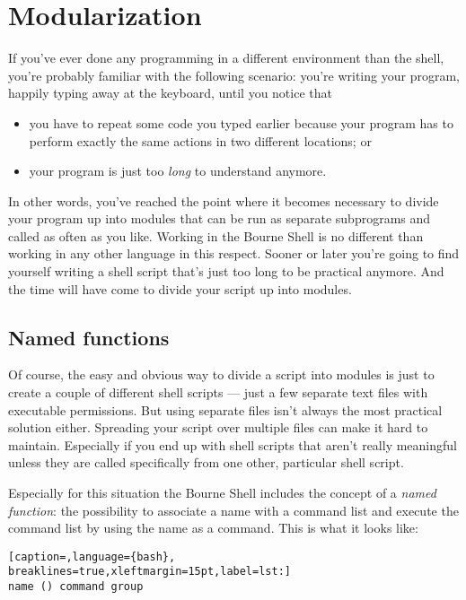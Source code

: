 \section{Modularization}
If you've ever done any programming in a different environment than the shell,
you're probably familiar with the following scenario: you're writing your
program, happily typing away at the keyboard, until you notice that

\begin{itemize}
\setlength{\leftmargin}{0pt}
\setlength{\itemsep}{0pt}
\setlength{\parsep}{0pt}
\setlength{\parskip}{0pt}
	\item you have to repeat some code you typed earlier because your program
has to perform exactly the same actions in two different locations; or
	\item your program is just too \emph{long} to understand anymore.
\end{itemize}

In other words, you've reached the point where it becomes necessary to divide
your program up into modules that can be run as separate subprograms and called
as often as you like. Working in the Bourne Shell is no different than working
in any other language in this respect. Sooner or later you're going to find
yourself writing a shell script that's just too long to be practical anymore.
And the time will have come to divide your script up into modules.

\subsection{Named functions}
Of course, the easy and obvious way to divide a script into modules is just to
create a couple of different shell scripts --- just a few separate text files
with executable permissions. But using separate files isn't always the most
practical solution either. Spreading your script over multiple files can make
it hard to maintain. Especially if you end up with shell scripts that aren't
really meaningful unless they are called specifically from one other,
particular shell script.

Especially for this situation the Bourne Shell includes the concept of a
\emph{named function}: the possibility to associate a name with a command list
and execute the command list by using the name as a command. This is what it
looks like:
\lstset{basicstyle=\scriptsize, numbers=left, captionpos=b, tabsize=4}
\begin{lstlisting}[caption=,language={bash},
breaklines=true,xleftmargin=15pt,label=lst:]
name () command group
\end{lstlisting}

